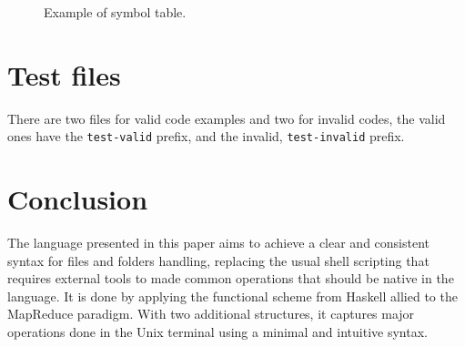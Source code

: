 \documentclass{article}
\begin{document}
\begin{figure}[ht]
\caption{Example of symbol table.}
\end {figure}

\section{Test files}
There are two files for valid code examples and two for invalid codes, the
valid ones have the \texttt{test-valid} prefix, and the invalid,
\texttt{test-invalid} prefix.


\section{Conclusion}
\label{sec:conclusion}
The language presented in this paper aims to achieve a clear and consistent
syntax for files and folders handling, replacing the usual shell scripting that
requires external tools to made common operations that should be native in the
language. It is done by applying the functional scheme from Haskell allied to
the MapReduce paradigm. With two additional structures, it captures major
operations done in the Unix terminal using a minimal and intuitive syntax.



\end{document}
